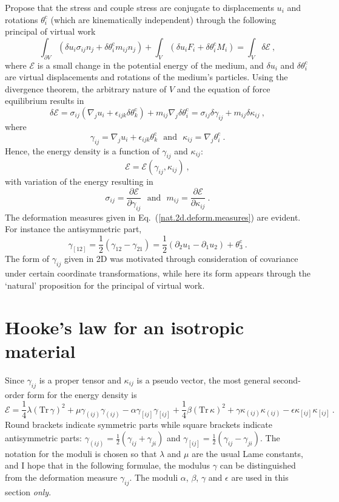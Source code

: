 \documentclass[]{scrreprt}
\newcommand{\si}{\sigma}
\newcommand{\mand}{\ \ \ \mbox{and}\ \ \ }
\newcommand{\pl}{\partial}
\newcommand{\ha}{\mbox{$\frac{1}{2}$}}
\newcommand{\thetac}{\theta^{\mathrm{c}}}
\newcommand{\ep}{\epsilon}
\newcommand{\ga}{\gamma}
\newcommand{\de}{\delta}
\newcommand{\ka}{\kappa}
\newcommand{\la}{\lambda}
\newcommand{\tr}{\mbox{Tr}\,}
\newcommand{\al}{\alpha}
\newcommand{\be}{\beta}
\begin{document}
Propose that the stress and couple stress are conjugate to
displacements $u_{i}$ and rotations $\thetac_{i}$ (which are kinematically
independent) through the following principal of virtual work
$$
\int_{\pl V}\left(\de u_{i}\si_{ij}n_{j} + \de\thetac_{i} m_{ij}n_{j}\right) +
\int_{V}\left(\de u_{i}F_{i} + \de\thetac_{i} M_{i}\right) = \int_{V}\de\mathcal{E} \ ,
$$
where $\mathcal{E}$ is a small change in the potential energy of the
medium, and $\de u_{i}$ and $\de\thetac_{i}$ are virtual displacements and
rotations of the medium's particles.  Using the divergence theorem,
the arbitrary nature of $V$ and the equation of force equilibrium
results in
$$
\de\mathcal{E} = \si_{ij}\left(\nabla_{j}u_{i}+\ep_{ijk}\de\thetac_{k}\right) +
m_{ij}\nabla_{j}\de\thetac_{i} = \si_{ij}\de\ga_{ij} + m_{ij}\de\ka_{ij}
\ ,
$$
where
\begin{equation}
\ga_{ij} = \nabla_{j}u_{i} + \ep_{ijk}\thetac_{k} \mand
\ka_{ij} = \nabla_{j}\thetac_{i} \ .
\label{ga.and.om.defns}
\end{equation}
Hence, the energy density is a function of $\ga_{ij}$ and $\ka_{ij}$:
$$
\mathcal{E} = \mathcal{E}(\ga_{ij},\ka_{ij}) \ ,
$$
with variation of the energy resulting in
$$
\si_{ij} = \frac{\pl \mathcal{E}}{\pl \ga_{ij}} \mand
m_{ij} = \frac{\pl \mathcal{E}}{\pl \ka_{ij}} \ .
$$
The deformation measures given in Eq.~(\ref{nat.2d.deform.measures})
are evident.  For instance the antisymmetric part,
$$
\ga_{[12]}=\ha(\ga_{12}-\ga_{21}) =
\ha(\pl_{2}u_{1}-\pl_{1}u_{2})+\thetac_{3} \ .
$$
The form of $\ga_{ij}$ given in 2D was motivated through consideration
of covariance under certain coordinate transformations, while here its
form appears through the `natural' proposition for the principal of
virtual work.

\section{Hooke's law for an isotropic material}

Since $\ga_{ij}$ is a proper tensor and $\ka_{ij}$ is a pseudo
vector, the most general second-order form for the energy density is
$$
\mathcal{E} = \mbox{$\frac{1}{4}$}\la(\tr\ga)^{2} +
\mu\ga_{(ij)}\ga_{(ij)} - \al\ga_{[ij]}\ga_{[ij]} 
+ \mbox{$\frac{1}{4}$}\be(\tr\ka)^{2} +
\ga\ka_{(ij)}\ka_{(ij)} - \ep\ka_{[ij]}\ka_{[ij]}  \ .
$$
Round brackets indicate symmetric parts while square brackets indicate
antisymmetric parts: $\ga_{(ij)} = \ha(\ga_{ij}+\ga_{ji})$ and
$\ga_{[ij]}=\ha(\ga_{ij}-\ga_{ji})$.  The notation for the moduli is
chosen so that $\la$ and $\mu$ are the usual Lame constants, and I
hope that in the following formulae, the modulus $\ga$ can be
distinguished from the deformation measure $\ga_{ij}$.  The moduli
$\al$, $\be$, $\ga$ and $\ep$ are used in this section {\em only}.
\end{document}
